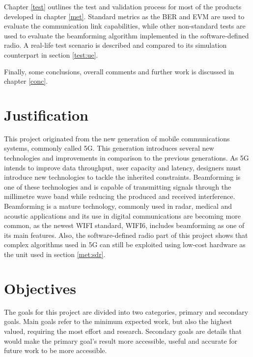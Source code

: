\documentclass[12pt,a4paper]{report}
\begin{document}
Chapter \ref{test} outlines the test and validation process for most of the products developed in chapter \ref{met}. Standard metrics as the BER and EVM are used to evaluate the communication link capabilities, while other non-standard tests are used to evaluate the beamforming algorithm implemented in the software-defined radio. A real-life test scenario is described and compared to its simulation counterpart in section \ref{test:ue}.

Finally, some conclusions, overall comments and further work is discussed in chapter \ref{conc}.

\section{Justification} \label{intro:just}
This project originated from the new generation of mobile communications systems, commonly called 5G. This generation introduces several new technologies and improvements in comparison to the previous generations. As 5G intends to improve data throughput, user capacity and latency, designers must introduce new technologies to tackle the inherited constraints. Beamforming is one of these technologies and is capable of transmitting signals through the millimetre wave band while reducing the produced and received interference. Beamforming is a mature technology, commonly used in radar, medical and acoustic applications and its use in digital communications are becoming more common, as the newest WIFI standard, WIFI6, includes beamforming as one of its main features. Also, the software-defined radio part of this project shows that complex algorithms used in 5G can still be exploited using low-cost hardware as the unit used in section \ref{met:sdr}.

\section{Objectives} \label{intro:obj}
The goals for this project are divided into two categories, primary and secondary goals. Main goals refer to the minimum expected work, but also the highest valued, requiring the most effort and research. Secondary goals are details that would make the primary goal's result more accessible, useful and accurate for future work to be more accessible.
\end{document}
